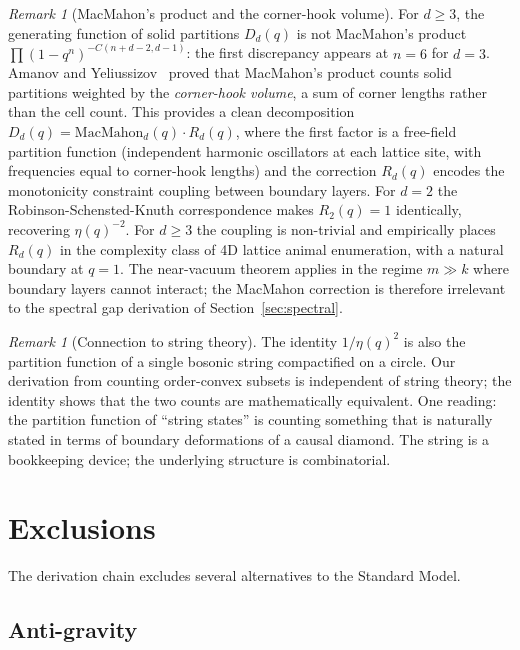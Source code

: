 \documentclass[11pt,letterpaper]{article}
\theoremstyle{remark}
\newtheorem{remark}[theorem]{Remark}
\begin{document}
\begin{remark}[MacMahon's product and the corner-hook volume]
For $d \geq 3$, the generating function of solid partitions
$D_d(q)$ is not MacMahon's product $\prod(1-q^n)^{-C(n+d-2,d-1)}$:
the first discrepancy appears at $n = 6$ for $d = 3$. Amanov and
Yeliussizov~\cite{AmanovYeliussizov2023} proved that MacMahon's
product counts solid partitions weighted by the \emph{corner-hook
volume}, a sum of corner lengths rather than the cell count.
This provides a clean decomposition
$D_d(q) = \mathrm{MacMahon}_d(q) \cdot R_d(q)$, where the first
factor is a free-field partition function (independent harmonic
oscillators at each lattice site, with frequencies equal to
corner-hook lengths) and the correction $R_d(q)$ encodes the
monotonicity constraint coupling between boundary layers. For
$d = 2$ the Robinson-Schensted-Knuth correspondence makes
$R_2(q) = 1$ identically, recovering $\eta(q)^{-2}$. For $d \geq 3$
the coupling is non-trivial and empirically places $R_d(q)$ in the
complexity class of 4D lattice animal enumeration, with a natural
boundary at $q = 1$. The near-vacuum theorem applies in the regime
$m \gg k$ where boundary layers cannot interact; the MacMahon
correction is therefore irrelevant to the spectral gap derivation
of Section~\ref{sec:spectral}.
\end{remark}

\begin{remark}[Connection to string theory]
The identity $1/\eta(q)^2$ is also the partition function of a
single bosonic string compactified on a circle. Our derivation from
counting order-convex subsets is independent of string theory; the
identity shows that the two counts are mathematically equivalent.
One reading: the partition function of ``string states'' is counting
something that is naturally stated in terms of boundary
deformations of a causal diamond. The string is a bookkeeping
device; the underlying structure is combinatorial.
\end{remark}

\section{Exclusions}
\label{sec:exclusions}

The derivation chain excludes several alternatives to the Standard
Model.

\subsection{Anti-gravity}
\end{document}
